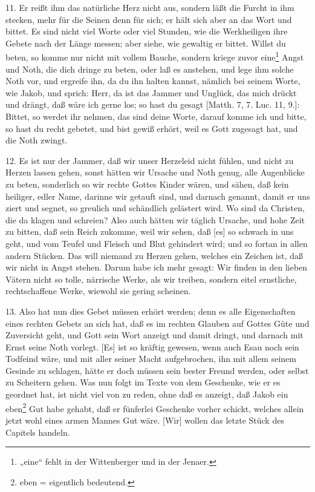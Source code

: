 11. Er reißt ihm das natürliche Herz nicht aus, sondern läßt die Furcht in ihm stecken, mehr für die Seinen denn für sich; er hält sich aber an das Wort und bittet. Es sind nicht viel Worte oder viel Stunden, wie die Werkheiligen ihre Gebete nach der Länge messen; aber siehe, wie gewaltig er bittet. Willst du beten, so komme nur nicht mit vollem Bauche, sondern kriege zuvor eine\footnote{„eine“ fehlt in der Wittenberger und in der Jenaer.} Angst und Noth, die dich dringe zu beten, oder laß es anstehen, und lege ihm solche Noth vor, und ergreife ihn, da du ihn halten kannst, nämlich bei seinem Worte, wie Jakob, und sprich: Herr, da ist das Jammer und Unglück, das mich drückt und drängt, daß wäre ich gerne los; so hast du gesagt [Matth. 7, 7. Luc. 11, 9.]: Bittet, so werdet ihr nehmen, das sind deine Worte, darauf komme ich und bitte, so hast du recht gebetet, und bist gewiß erhört, weil es Gott zugesagt hat, und die Noth zwingt.

12. Es ist nur der Jammer, daß wir unser Herzeleid nicht fühlen, und nicht zu Herzen lassen gehen, sonst hätten wir Ursache und Noth genug, alle Augenblicke zu beten, sonderlich so wir rechte Gottes Kinder wären, und sähen, daß kein heiliger, edler Name, darinne wir getauft sind, und
darnach genannt, damit er uns ziert und segnet, so greulich und schändlich gelästert wird. Wo sind da Christen, die da klagen und schreien? Also auch hätten wir täglich Ursache, und hohe Zeit zu bitten, daß sein Reich zukomme, weil wir sehen, daß [es] so schwach in uns geht, und vom Teufel und Fleisch und Blut gehindert wird; und so fortan in allen andern Stücken. Das will niemand zu Herzen gehen, welches ein Zeichen ist, daß wir nicht in Angst stehen. Darum habe ich mehr gesagt: Wir finden in den lieben Vätern nicht so tolle, närrische Werke, als wir treiben, sondern eitel ernstliche, rechtschaffene Werke, wiewohl sie gering scheinen.

13. Also hat nun dies Gebet müssen erhört werden; denn es alle Eigenschaften eines rechten Gebets an sich hat, daß es im rechten Glauben auf Gottes Güte und Zuversicht geht, und Gott sein Wort anzeigt und damit dringt, und darnach mit Ernst seine Noth vorlegt. [Es] ist so kräftig gewesen, wenn auch Esau noch sein Todfeind wäre, und mit aller seiner Macht aufgebrochen, ihn mit allem seinem Gesinde zu schlagen, hätte er doch müssen sein bester Freund werden, oder selbst zu Scheitern gehen. Was nun folgt im Texte von dem Geschenke, wie er es geordnet hat, ist nicht viel von zu reden, ohne daß es anzeigt, daß Jakob ein eben\footnote{eben = eigentlich bedeutend.} Gut habe gehabt, daß er fünferlei Geschenke vorher schickt, welches allein jetzt wohl eines armen Mannes Gut wäre. [Wir] wollen das letzte Stück des Capitels handeln.

